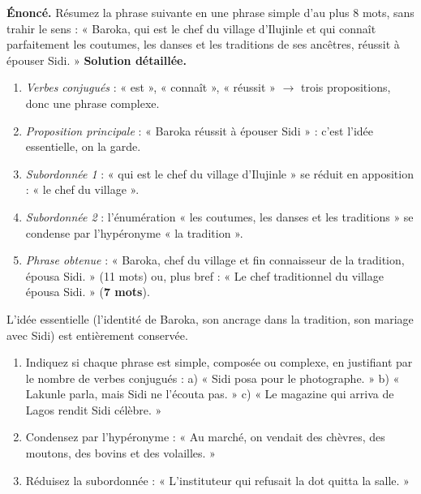 \documentclass[11pt]{article}
\begin{document}
\begin{exoresolu}
\textbf{Énoncé.} Résumez la phrase suivante en une phrase simple d'au plus 8 mots, sans trahir le sens : « Baroka, qui est le chef du village d'Ilujinle et qui connaît parfaitement les coutumes, les danses et les traditions de ses ancêtres, réussit à épouser Sidi. »
\tcblower
\textbf{Solution détaillée.}
\begin{enumerate}
\item \emph{Verbes conjugués} : « est », « connaît », « réussit » $\rightarrow$ trois propositions, donc une phrase complexe.
\item \emph{Proposition principale} : « Baroka réussit à épouser Sidi » : c'est l'idée essentielle, on la garde.
\item \emph{Subordonnée 1} : « qui est le chef du village d'Ilujinle » se réduit en apposition : « le chef du village ».
\item \emph{Subordonnée 2} : l'énumération « les coutumes, les danses et les traditions » se condense par l'hypéronyme « la tradition ».
\item \emph{Phrase obtenue} : « Baroka, chef du village et fin connaisseur de la tradition, épousa Sidi. » (11 mots) ou, plus bref : « Le chef traditionnel du village épousa Sidi. » (\textbf{7 mots}).
\end{enumerate}
L'idée essentielle (l'identité de Baroka, son ancrage dans la tradition, son mariage avec Sidi) est entièrement conservée.
\end{exoresolu}

\begin{exercice}
\begin{enumerate}
\item Indiquez si chaque phrase est simple, composée ou complexe, en justifiant par le nombre de verbes conjugués : a) « Sidi posa pour le photographe. » b) « Lakunle parla, mais Sidi ne l'écouta pas. » c) « Le magazine qui arriva de Lagos rendit Sidi célèbre. »
\item Condensez par l'hypéronyme : « Au marché, on vendait des chèvres, des moutons, des bovins et des volailles. »
\item Réduisez la subordonnée : « L'instituteur qui refusait la dot quitta la salle. »
\end{enumerate}
\end{exercice}
\end{document}
